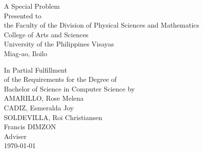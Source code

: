 \begin{titlepage}
\centering


\vspace{1.75cm}
A Special Problem\\
Presented to\\
the Faculty of the Division of Physical Sciences and Mathematics\\
College of Arts and Sciences\\
University of the Philippines Visayas\\
Miag-ao, Iloilo

\vspace{1.75cm}
In Partial Fulfillment\\
of the Requirements for the Degree of\\
Bachelor of Science in Computer Science
\vspace{1.75cm}
by\\

\vspace{1cm}
AMARILLO, Rose Melena  \\
CADIZ, Esmeralda Joy  \\
SOLDEVILLA, Roi Christiansen  \\

\vspace{1.75cm}
Francis DIMZON \\
Adviser\\

\vspace{1.75cm}
\today
\end{titlepage}
